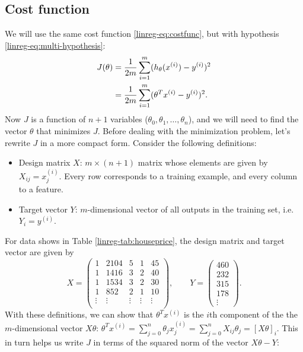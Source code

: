 \documentclass{article}
\theoremstyle{definition}
\begin{document}
\subsection{Cost function}
We will use the same cost function \eqref{linreg-eq:costfunc}, but with hypothesis \eqref{linreg-eq:multi-hypothesis}:
\begin{align}
    J(\theta) &= \frac{1}{2m}\sum_{i=1}^{m}(h_{\theta}(x^{(i)}) - y^{(i)})^2 \notag\\
    &= \frac{1}{2m}\sum_{i=1}^{m}(\theta^Tx^{(i)} - y^{(i)})^2.
    \label{linreg-eq:multi-costfunc}
\end{align}
Now $J$ is a function of $n+1$ variables ($\theta_0, \theta_1, \dots, \theta_n$), and we will need to find the vector $\theta$ that minimizes $J$. Before dealing with the minimization problem, let's rewrite $J$ in a more compact form. Consider the following definitions:
\begin{itemize}
    \item Design matrix $X$: $m \times (n+1)$ matrix whose elements are given by $X_{ij} = x^{(i)}_j$. Every row corresponds to a training example, and every column to a feature.
    \item Target vector $Y$: $m$-dimensional vector of all outputs in the training set, i.e. $Y_i=y^{(i)}$.
\end{itemize}
For data shows in Table \ref{linreg-tab:houseprice}, the design matrix and target vector are given by
\begin{equation}
    X =
    \begin{pmatrix}
        1 & 2104 & 5 & 1 & 45 \\
        1 & 1416 & 3 & 2 & 40 \\
        1 & 1534 & 3 & 2 & 30 \\
        1 & 852 & 2 & 1 & 10 \\
        \vdots & \vdots & \vdots & \vdots & \vdots \\
    \end{pmatrix},
    \qquad
    Y =
    \begin{pmatrix}
        460 \\
        232 \\
        315 \\
        178 \\
        \vdots
    \end{pmatrix}.
\end{equation}
With these definitions, we can show that $\theta^Tx^{(i)}$ is the $i$th component of the the $m$-dimensional vector $X\theta$: $\theta^Tx^{(i)}=\sum_{j=0}^n\theta_jx^{(i)}_j=\sum_{j=0}^nX_{ij}\theta_j=[X\theta]_i$. This in turn helps us write $J$ in terms of the squared norm of the vector $X\theta - Y$:
\end{document}
